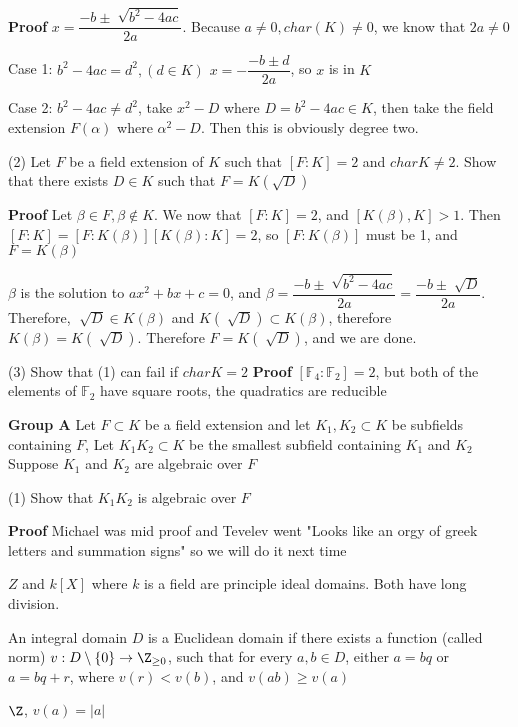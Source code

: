 \documentclass[twoside, 10pt]{article}
\newcommand{\F}{\mathbb{F}}
\begin{document}
\textbf{Proof} $x = \dfrac{- b \pm \sqrt[]{b^2 - 4ac}}{2a}$. Because $a\neq 0, char(K) \neq 0$, we know that $2a \neq 0$

Case 1: $b^2 - 4ac = d^2, (d \in K)$ $x = - \dfrac{- b \pm d}{2a}$, so $x$ is in $K$

Case 2: $b^2 - 4ac \neq d^2$, take $x^2 - D$ where $D = b^2 - 4ac \in K$, then take the field extension $F(\alpha)$ where $\alpha^2 - D$. Then this is obviously degree two.

(2) Let $F$ be a field extension of $K$ such that $[F: K] = 2$ and $charK \neq 2$. Show that there exists $D \in K$ such that $F = K(\sqrt{D})$

\textbf{Proof} Let $\beta \in F, \beta \not \in K$. We now that $[F : K] = 2$, and $[K(\beta), K] > 1$. Then $[F: K] = [F : K(\beta)][K(\beta): K] = 2$, so $[F : K(\beta)]$ must be 1, and $F = K(\beta)$

$\beta$ is the solution to $ax^2 + bx + c = 0$, and $\beta = \dfrac{-b \pm \sqrt[]{b^2 - 4ac}}{2a} = \dfrac{-b \pm \sqrt[]{D}}{2a}$. Therefore, $\sqrt[]{D} \in K(\beta)$ and $K(\sqrt[]{D}) \subset K(\beta)$, therefore $K(\beta) = K(\sqrt[]{D})$. Therefore $F = K(\sqrt[]{D})$, and we are done.

(3) Show that (1) can fail if $charK = 2$
\textbf{Proof} $[\F_4 : \F_2] = 2$, but both of the elements of $\F_2$ have square roots, the quadratics are reducible

\textbf{Group A}
Let $F \subset K$ be a field extension and let $K_1, K_2 \subset K$ be subfields containing $F$, Let $K_1K_2 \subset K$ be the smallest subfield containing $K_1$ and $K_2$ Suppose $K_1$ and $K_2$ are algebraic over $F$

(1) Show that $K_1K_2$ is algebraic over $F$

\textbf{Proof}
Michael was mid proof and Tevelev went "Looks like an orgy of greek letters and summation signs" so we will do it next time

$Z$ and $k[X]$ where $k$ is a field are principle ideal domains. Both have long division. 

\begin{defn}
    An integral domain $D$ is a Euclidean domain if there exists a function (called norm) $v: D\setminus\{0\} \to \Z_{\geq 0}$, such that for every $a, b \in D$, either $a = bq$ or $a = bq + r$, where $v(r) < v(b)$, and $v(ab) \geq v(a)$
\end{defn}

\begin{exm*}
    $\Z$, $v(a) = |a|$
\end{exm*}
\end{document}

